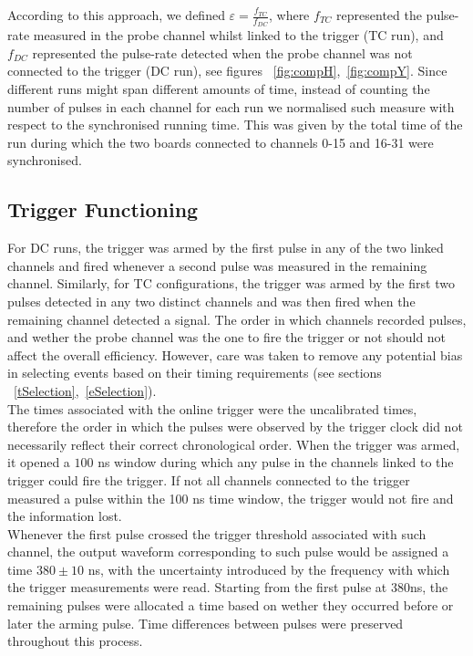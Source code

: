 \documentclass[12pt]{article}
\begin{document}
According to this approach, we defined $\varepsilon=\frac{f_{TC}}{f_{DC}}$, where $f_{TC}$ represented the pulse-rate measured in the probe channel whilst linked to the trigger (TC run), and $f_{DC}$ represented the pulse-rate detected when the probe channel was not connected to the trigger (DC run), see figures ~\ref{fig:compH},~\ref{fig:compY}. Since different runs might span different amounts of time, instead of counting the number of pulses in each channel for each run we normalised such measure with respect to the synchronised running time. This was given by the total time of the run during which the two boards connected to channels 0-15 and 16-31 were synchronised. \\




\subsection{Trigger Functioning}
For DC runs, the trigger was armed by the first pulse in any of the two linked channels and fired whenever a second pulse was measured in the remaining channel. Similarly, for TC configurations, the trigger was armed by the first two pulses detected in any two distinct channels and was then fired when the remaining channel detected a signal. The order in which channels recorded pulses, and wether the probe channel was the one to fire the trigger or not should not affect the overall efficiency. However, care was taken to remove any potential bias in selecting events based on their timing requirements (see sections ~\ref{tSelection},~\ref{eSelection}). \\

The times associated with the online trigger were the uncalibrated times, therefore the order in which the pulses were observed by the trigger clock did not necessarily reflect their correct chronological order. When the trigger was armed, it opened a $100$ ns window during which any pulse in the channels linked to the trigger could fire the trigger. If not all channels connected to the trigger measured a pulse within the 100 ns time window, the trigger would not fire and the information lost.  \\
Whenever the first pulse crossed the trigger threshold associated with such channel, the output waveform corresponding to such pulse would be assigned a time $380\pm10$ ns, with the uncertainty introduced by the frequency with which the trigger measurements were read. Starting from the first pulse at $380$ns, the remaining pulses were allocated a time based on wether they occurred before or later the arming pulse. Time differences between pulses were preserved throughout this process.
\end{document}
